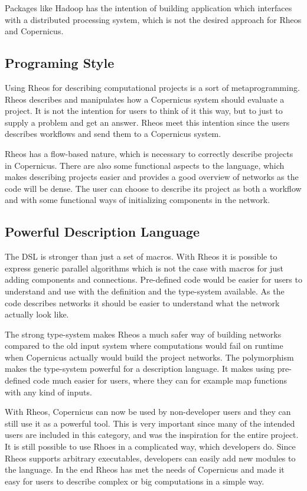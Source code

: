 Packages like Hadoop has the intention of building application which
interfaces with a distributed processing system, which is not the
desired approach for Rheos and Copernicus.

\subsection{Programing Style}
Using Rheos for describing computational projects is a sort of
metaprogramming. Rheos describes and manipulates how a Copernicus
system should evaluate a project. It is not the intention for users
to think of it this way, but to just to supply a problem and get an
answer. Rheos meet this intention since the users describes workflows
and send them to a Copernicus system.

Rheos has a flow-based nature, which is necessary to correctly
describe projects in Copernicus. There are also some functional
aspects to the language, which makes describing projects easier and
provides a good overview of networks as the code will be dense. The
user can choose to describe its project as both a workflow and with
some functional ways of initializing components in the network.


\subsection{Powerful Description Language}
The DSL is stronger than just a set of macros. With Rheos it is
possible to express generic parallel algorithms which is not the case
with macros for just adding components and connections. Pre-defined
code would be easier for users to understand and use with the
definition and the type-system available. As the code describes
networks it should be easier to understand what the network actually
look like.

The strong type-system makes Rheos a much safer way of building
networks compared to the old input system where computations would
fail on runtime when Copernicus actually would build the project
networks. The polymorphism makes the type-system powerful for a
description language. It makes using pre-defined code much easier for
users, where they can for example map functions with any kind of
inputs.

With Rheos, Copernicus can now be used by non-developer users and they
can still use it as a powerful tool. This is very important since many
of the intended users are included in this category, and was the
inspiration for the entire project. It is still possible to use Rhoes
in a complicated way, which developers do. Since Rheos supports
arbitrary executables, developers can easily add new modules to the
language. In the end Rheos has met the needs of Copernicus and made it
easy for users to describe complex or big computations in a simple
way.
